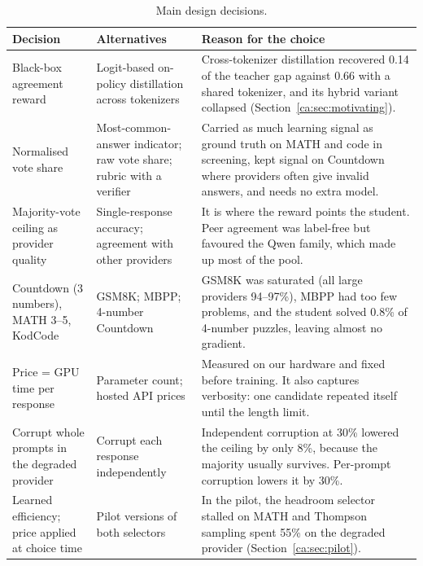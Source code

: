 \begin{table}[htbp]
\centering
\footnotesize
\renewcommand{\arraystretch}{1.1}
\begin{tabular}{@{}>{\raggedright\arraybackslash}p{2.7cm}
                >{\raggedright\arraybackslash}p{3.9cm}
                >{\raggedright\arraybackslash}p{8.3cm}@{}}
\toprule
\textbf{Decision} & \textbf{Alternatives} & \textbf{Reason for the choice} \\
\midrule
Black-box agreement reward & Logit-based on-policy distillation across tokenizers &
  Cross-tokenizer distillation recovered 0.14 of the teacher gap against 0.66 with a shared
  tokenizer, and its hybrid variant collapsed (Section~\ref{ca:sec:motivating}). \\
Normalised vote share & Most-common-answer indicator; raw vote share; rubric with a verifier &
  Carried as much learning signal as ground truth on MATH and code in screening, kept
  signal on Countdown where providers often give invalid answers, and needs no extra model. \\
Majority-vote ceiling as provider quality & Single-response accuracy; agreement with other providers &
  It is where the reward points the student. Peer agreement was label-free but favoured the
  Qwen family, which made up most of the pool. \\
Countdown (3 numbers), MATH 3--5, KodCode & GSM8K; MBPP; 4-number Countdown &
  GSM8K was saturated (all large providers 94--97\%), MBPP had too few problems, and the
  student solved 0.8\% of 4-number puzzles, leaving almost no gradient. \\
Price = GPU time per response & Parameter count; hosted API prices &
  Measured on our hardware and fixed before training. It also captures verbosity: one
  candidate repeated itself until the length limit. \\
Corrupt whole prompts in the degraded provider & Corrupt each response independently &
  Independent corruption at 30\% lowered the ceiling by only 8\%, because the majority
  usually survives. Per-prompt corruption lowers it by 30\%. \\
Learned efficiency; price applied at choice time & Pilot versions of both selectors &
  In the pilot, the headroom selector stalled on MATH and Thompson sampling spent 55\% on
  the degraded provider (Section~\ref{ca:sec:pilot}). \\
\bottomrule
\end{tabular}
\caption{Main design decisions.}
\label{ca:tab:decisions}
\end{table}
